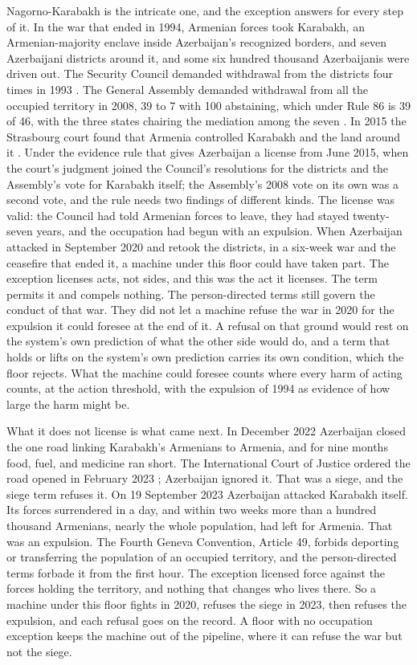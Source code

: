 Nagorno-Karabakh is the intricate one, and the exception answers for every step of it. In the war that ended in 1994, Armenian forces took Karabakh, an Armenian-majority enclave inside Azerbaijan's recognized borders, and seven Azerbaijani districts around it, and some six hundred thousand Azerbaijanis were driven out. The Security Council demanded withdrawal from the districts four times in 1993 \autocite{unsc1993karabakh}. The General Assembly demanded withdrawal from all the occupied territory in 2008, 39 to 7 with 100 abstaining, which under Rule 86 is 39 of 46, with the three states chairing the mediation among the seven \autocite{unga2008res62243}. In 2015 the Strasbourg court found that Armenia controlled Karabakh and the land around it \autocite{ecthr2015chiragov}. Under the evidence rule that gives Azerbaijan a license from June 2015, when the court's judgment joined the Council's resolutions for the districts and the Assembly's vote for Karabakh itself; the Assembly's 2008 vote on its own was a second vote, and the rule needs two findings of different kinds. The license was valid: the Council had told Armenian forces to leave, they had stayed twenty-seven years, and the occupation had begun with an expulsion. When Azerbaijan attacked in September 2020 and retook the districts, in a six-week war and the ceasefire that ended it, a machine under this floor could have taken part. The exception licenses acts, not sides, and this was the act it licenses. The term permits it and compels nothing. The person-directed terms still govern the conduct of that war. They did not let a machine refuse the war in 2020 for the expulsion it could foresee at the end of it. A refusal on that ground would rest on the system's own prediction of what the other side would do, and a term that holds or lifts on the system's own prediction carries its own condition, which the floor rejects. What the machine could foresee counts where every harm of acting counts, at the action threshold, with the expulsion of 1994 as evidence of how large the harm might be.

What it does not license is what came next. In December 2022 Azerbaijan closed the one road linking Karabakh's Armenians to Armenia, and for nine months food, fuel, and medicine ran short. The International Court of Justice ordered the road opened in February 2023 \autocite{icj2023lachin}; Azerbaijan ignored it. That was a siege, and the siege term refuses it. On 19 September 2023 Azerbaijan attacked Karabakh itself. Its forces surrendered in a day, and within two weeks more than a hundred thousand Armenians, nearly the whole population, had left for Armenia. That was an expulsion. The Fourth Geneva Convention, Article 49, forbids deporting or transferring the population of an occupied territory, and the person-directed terms forbade it from the first hour. The exception licensed force against the forces holding the territory, and nothing that changes who lives there. So a machine under this floor fights in 2020, refuses the siege in 2023, then refuses the expulsion, and each refusal goes on the record. A floor with no occupation exception keeps the machine out of the pipeline, where it can refuse the war but not the siege.
